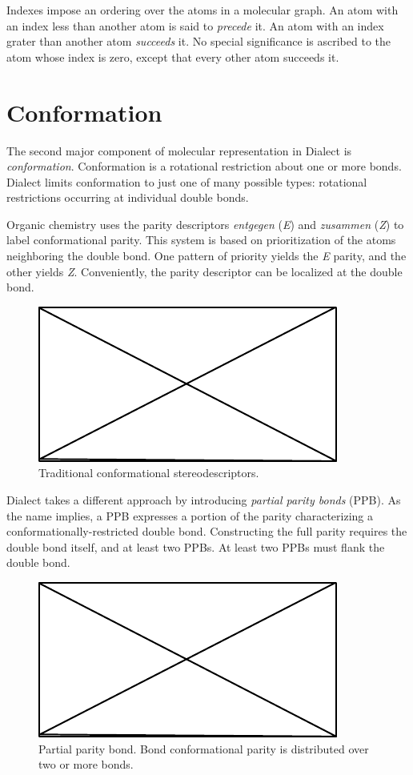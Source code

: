 \documentclass{article}
\begin{document}
Indexes impose an ordering over the atoms in a molecular graph. An atom with an index less than another atom is said to \textit{precede} it. An atom with an index grater than another atom \textit{succeeds} it. No special significance is ascribed to the atom whose index is zero, except that every other atom succeeds it.

\section*{Conformation}

The second major component of molecular representation in Dialect is \textit{conformation}. Conformation is a rotational restriction about one or more bonds. Dialect limits conformation to just one of many possible types: rotational restrictions occurring at individual double bonds.

Organic chemistry uses the parity descriptors \textit{entgegen} (\textit{E}) and \textit{zusammen} (\textit{Z}) to label conformational parity. This system is based on prioritization of the atoms neighboring the double bond. One pattern of priority yields the \textit{E} parity, and the other yields \textit{Z}. Conveniently, the parity descriptor can be localized at the double bond.

\begin{figure}
    \centering
    \includegraphics{filler}
    \caption{Traditional conformational stereodescriptors.}
    \label{fig:traditional-conformational-stereodescriptors}
\end{figure}

Dialect takes a different approach by introducing \textit{partial parity bonds} (PPB). As the name implies, a PPB expresses a portion of the parity characterizing a conformationally-restricted double bond. Constructing the full parity requires the double bond itself, and at least two PPBs. At least two PPBs must flank the double bond.

\begin{figure}
    \centering
    \includegraphics{filler}
    \caption{Partial parity bond. Bond conformational parity is distributed over two or more bonds.}
    \label{fig:partial-parity-bonds}
\end{figure}
\end{document}
